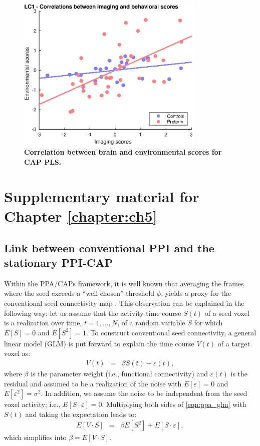 \begin{figure}[h]
\centering
\includegraphics[width=0.8\textwidth]{images/Appendix/ch3_CAPs_BrainScoresxBehavScores.eps}
\caption{\textbf{Correlation between brain and environmental scores for CAP PLS.}  }
\label{fig:ch3_CAP_brainXbehavScores}
\end{figure}


\chapter{Supplementary material for Chapter \ref{chapter:ch5}} \label{appA}

\renewcommand{\theequation}{Eq. \thechapter.\arabic{equation}}

\section{Link between conventional PPI and the stationary PPI-CAP} 


Within the PPA/CAPs framework, it is well known that averaging the frames where the seed exceeds a ``well chosen'' threshold $\phi$, yields a proxy for the conventional seed connectivity map \citep{Tagliazucchi2012,Liu2013}.
This observation can be explained in the following way:
let us assume that the activity time course $S(t)$ of a seed voxel is a realization over time, $t=1,\ldots,N$, of a random variable $S$ for which $E[S]=0$ and $E[S^2]=1$. 
To construct conventional seed connectivity, a general linear model (GLM) is put forward to explain the time course $V(t)$ of a target voxel as:
\begin{eqnarray}
\label{eqn:ppa_glm}
  V(t) & =& \beta S(t) + \varepsilon(t),
\end{eqnarray}
where $\beta$ is the parameter weight (i.e., functional connectivity) and $\varepsilon(t)$ is the residual and assumed to be a realization of the noise with $E[\varepsilon]=0$ and  $E[\varepsilon^2]=\sigma^2$. In addition, we assume the noise to be independent from the seed voxel activity; i.e., $E[S\cdot \varepsilon]=0$. Multiplying both sides of \ref{eqn:ppa_glm} with $S(t)$ and taking the expectation leads to:
\begin{eqnarray}
   E[ V  \cdot S ]  & = & \beta E[S^2] + E[S \cdot \varepsilon],
\end{eqnarray}
which simplifies into $\beta=E[V\cdot S]$. 


